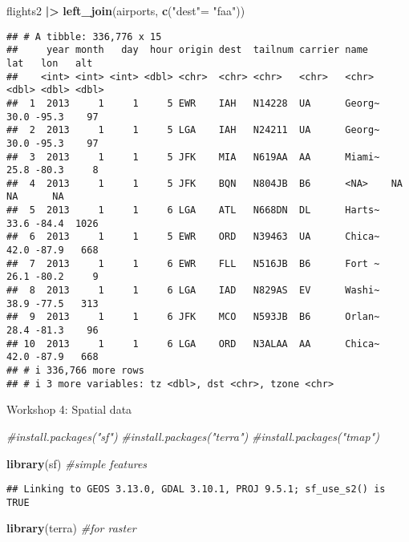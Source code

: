 \documentclass[
]{article}
\newenvironment{Shaded}{\begin{snugshade}}{\end{snugshade}}
\newcommand{\CommentTok}[1]{\textcolor[rgb]{0.56,0.35,0.01}{\textit{#1}}}
\newcommand{\FunctionTok}[1]{\textcolor[rgb]{0.13,0.29,0.53}{\textbf{#1}}}
\newcommand{\NormalTok}[1]{#1}
\newcommand{\OtherTok}[1]{\textcolor[rgb]{0.56,0.35,0.01}{#1}}
\newcommand{\SpecialCharTok}[1]{\textcolor[rgb]{0.81,0.36,0.00}{\textbf{#1}}}
\newcommand{\StringTok}[1]{\textcolor[rgb]{0.31,0.60,0.02}{#1}}
\begin{document}
\begin{Shaded}
\begin{Highlighting}[]
\NormalTok{flights2 }\SpecialCharTok{|\textgreater{}}
  \FunctionTok{left\_join}\NormalTok{(airports, }\FunctionTok{c}\NormalTok{(}\StringTok{"dest"}\OtherTok{=} \StringTok{"faa"}\NormalTok{))}
\end{Highlighting}
\end{Shaded}

\begin{verbatim}
## # A tibble: 336,776 x 15
##     year month   day  hour origin dest  tailnum carrier name     lat   lon   alt
##    <int> <int> <int> <dbl> <chr>  <chr> <chr>   <chr>   <chr>  <dbl> <dbl> <dbl>
##  1  2013     1     1     5 EWR    IAH   N14228  UA      Georg~  30.0 -95.3    97
##  2  2013     1     1     5 LGA    IAH   N24211  UA      Georg~  30.0 -95.3    97
##  3  2013     1     1     5 JFK    MIA   N619AA  AA      Miami~  25.8 -80.3     8
##  4  2013     1     1     5 JFK    BQN   N804JB  B6      <NA>    NA    NA      NA
##  5  2013     1     1     6 LGA    ATL   N668DN  DL      Harts~  33.6 -84.4  1026
##  6  2013     1     1     5 EWR    ORD   N39463  UA      Chica~  42.0 -87.9   668
##  7  2013     1     1     6 EWR    FLL   N516JB  B6      Fort ~  26.1 -80.2     9
##  8  2013     1     1     6 LGA    IAD   N829AS  EV      Washi~  38.9 -77.5   313
##  9  2013     1     1     6 JFK    MCO   N593JB  B6      Orlan~  28.4 -81.3    96
## 10  2013     1     1     6 LGA    ORD   N3ALAA  AA      Chica~  42.0 -87.9   668
## # i 336,766 more rows
## # i 3 more variables: tz <dbl>, dst <chr>, tzone <chr>
\end{verbatim}

Workshop 4: Spatial data

\begin{Shaded}
\begin{Highlighting}[]
\CommentTok{\#install.packages("sf")}
\CommentTok{\#install.packages("terra")}
\CommentTok{\#install.packages("tmap")}

\FunctionTok{library}\NormalTok{(sf) }\CommentTok{\#simple features}
\end{Highlighting}
\end{Shaded}

\begin{verbatim}
## Linking to GEOS 3.13.0, GDAL 3.10.1, PROJ 9.5.1; sf_use_s2() is TRUE
\end{verbatim}

\begin{Shaded}
\begin{Highlighting}[]
\FunctionTok{library}\NormalTok{(terra) }\CommentTok{\#for raster}
\end{Highlighting}
\end{Shaded}
\end{document}
